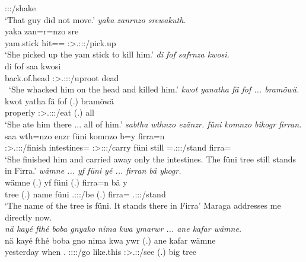 \begin{exe}
	{\Neg} \Sg:\Sbj:\Pst:\Pfv/shake {\Dem}\\
	\trans `That guy did not move.'
	\emph{yaka zanrnzo srewakuth.}\\
	\gll yaka zan=r=nzo sre\\
	yam.stick hit=\Purp={\Only} \Sg:\Sbj>\Tsg.\Masc:\Obj:\Irr:\Pfv/pick.up\\
	\trans `She picked up the yam stick to kill him.'
	\emph{di fof safrnza kwosi.}\\
	\gll di fof saa kwosi\\
	{back.of.head} {\Emph} \Sg:\Sbj>\Tsg.\Masc:\Obj:\Pst:\Pfv/uproot dead\\\
	\trans `She whacked him on the head and killed him.'
	\emph{kwot yanatha fä fof ... bramöwä.}\\
	\gll kwot yatha fä fof (.) bramöwä\\
	properly \Sg:\Sbj>\Tsg.\Masc:\Obj:\Pst:\Ipfv/eat {\Dist} {\Emph} (.) all\\
	\trans `She ate him there ... all of him.'
	\emph{sabtha wthnzo ezänzr. füni komnzo bikogr firran.}\\
	\gll saa wth=nzo enzr füni komnzo b=y firra=n\\
	\Sg:\Sbj>\Tsg.\Masc:\Obj:\Pst:\Pfv/finish intestines={\Only} \Stsg:\Sbj>\Stpl:\Obj:\Nonpast:\Ipfv/carry füni  still \Med=\Tsg.\Masc:\Sbj:\Nonpast:\Stat/stand firra={\Loc}\\
	\trans `She finished him and carried away only the intestines. The füni tree still stands in Firra.'
\exi{50}
	\emph{wämne ... yf füni yé ... firran bä ykogr.}\\
	\gll wämne (.) yf füni  (.) firra=n bä y\\
	tree (.) name füni \Tsg.\Masc:\Sbj:\Nonpast:\Ipfv/be (.) firra={\Loc} \Med{} \Tsg.\Masc:\Sbj:\Nonpast:\Stat/stand\\
	\trans `The name of the tree is füni. It stands there in Firra'
\exi{51}
	{\footnotesize{Maraga addresses me directly now.}}\\
	\emph{nä kayé fthé boba gnyako nima kwa ymarwr ... ane kafar wämne.}\\
	\gll nä kayé fthé boba gn\stem{yak}o nima kwa y\stem{mar}wr (.) ane kafar wämne\\
	{\Indf} yesterday when \Med.{\All} \Ssg:\Sbj:\Imp:\Ipfv:\Andat/go {like.this} {\Fut} \Stsg:\Sbj>\Tsg.\Masc:\Nonpast:\Ipfv/see (.) {\Dem} big tree\\

\end{exe}
